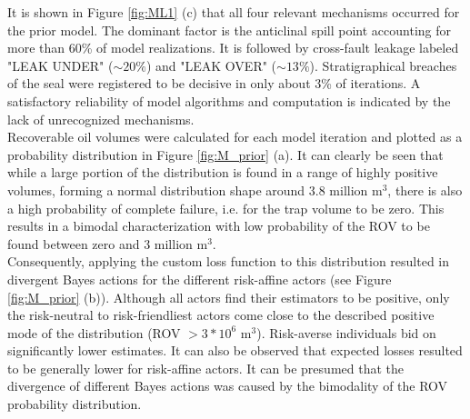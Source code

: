 		It is shown in Figure \ref{fig:ML1} (c) that all four relevant mechanisms occurred for the prior model. The dominant factor is the anticlinal spill point accounting for more than 60\% of model realizations. It is followed by cross-fault leakage labeled "LEAK UNDER" ($\sim20\%$) and "LEAK OVER" ($\sim13\%$). Stratigraphical breaches of the seal were registered to be decisive in only about 3\% of iterations. A satisfactory reliability of model algorithms and computation is indicated by the lack of unrecognized mechanisms.\\
		Recoverable oil volumes were calculated for each model iteration and plotted as a probability distribution in Figure \ref{fig:M_prior} (a). It can clearly be seen that while a large portion of the distribution is found in a range of highly positive volumes, forming a normal distribution shape around 3.8 million m$^3$, there is also a high probability of complete failure, i.e. for the trap volume to be zero. This results in a bimodal characterization with low probability of the ROV to be found between zero and 3 million m$^3$.\\
		Consequently, applying the custom loss function to this distribution resulted in divergent Bayes actions for the different risk-affine actors (see Figure \ref{fig:M_prior} (b)). Although all actors find their estimators to be positive, only the risk-neutral to risk-friendliest actors come close to the described positive mode of the distribution (ROV $> 3*10^6$ m$^3$). Risk-averse individuals bid on significantly lower estimates. It can also be observed that expected losses resulted to be generally lower for risk-affine actors. It can be presumed that the divergence of different Bayes actions was caused by the bimodality of the ROV probability distribution.
		
